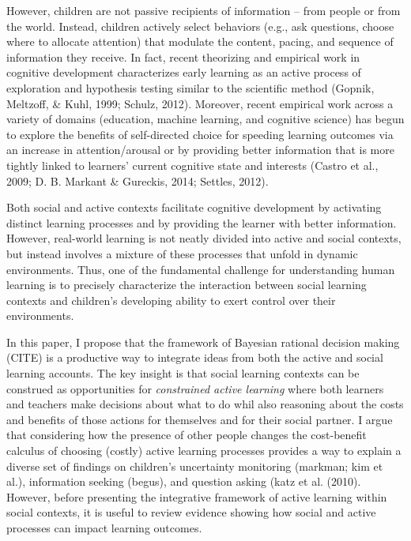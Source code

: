 \documentclass[a4paper,man,apacite,floatsintext]{apa6}
\begin{document}
However, children are not passive recipients of information -- from
people or from the world. Instead, children actively select behaviors
(e.g., ask questions, choose where to allocate attention) that modulate
the content, pacing, and sequence of information they receive. In fact,
recent theorizing and empirical work in cognitive development
characterizes early learning as an active process of exploration and
hypothesis testing similar to the scientific method (Gopnik, Meltzoff,
\& Kuhl, 1999; Schulz, 2012). Moreover, recent empirical work across a
variety of domains (education, machine learning, and cognitive science)
has begun to explore the benefits of self-directed choice for speeding
learning outcomes via an increase in attention/arousal or by providing
better information that is more tightly linked to learners' current
cognitive state and interests (Castro et al., 2009; D. B. Markant \&
Gureckis, 2014; Settles, 2012).

Both social and active contexts facilitate cognitive development by
activating distinct learning processes and by providing the learner with
better information. However, real-world learning is not neatly divided
into active and social contexts, but instead involves a mixture of these
processes that unfold in dynamic environments. Thus, one of the
fundamental challenge for understanding human learning is to precisely
characterize the interaction between social learning contexts and
children's developing ability to exert control over their environments.

In this paper, I propose that the framework of Bayesian rational
decision making (CITE) is a productive way to integrate ideas from both
the active and social learning accounts. The key insight is that social
learning contexts can be construed as opportunities for
\emph{constrained active learning} where both learners and teachers make
decisions about what to do whil also reasoning about the costs and
benefits of those actions for themselves and for their social partner. I
argue that considering how the presence of other people changes the
cost-benefit calculus of choosing (costly) active learning processes
provides a way to explain a diverse set of findings on children's
uncertainty monitoring (markman; kim et al.), information seeking
(begus), and question asking (katz et al. (2010). However, before
presenting the integrative framework of active learning within social
contexts, it is useful to review evidence showing how social and active
processes can impact learning outcomes.
\end{document}
